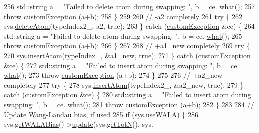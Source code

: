 \begin{DoxyCode}
256             std::string a = \textcolor{stringliteral}{"Failed to delete atom during swapping: "}, b = ce.
      \hyperlink{classcustom_exception_aeb6ab5848b038adfc68fde86a512f691}{what}();
257             \textcolor{keywordflow}{throw} \hyperlink{classcustom_exception}{customException} (a+b);
258         \}
259 
260         \textcolor{comment}{// -a2 completely}
261         \textcolor{keywordflow}{try} \{
262             sys.\hyperlink{classsim_system_acabf4fc5b5b90bba62e1449ddb3646c6}{deleteAtom}(typeIndex2\_, a2, \textcolor{keyword}{true});
263         \} \textcolor{keywordflow}{catch} (\hyperlink{classcustom_exception}{customException} &ce) \{
264             std::string a = \textcolor{stringliteral}{"Failed to delete atom during swapping: "}, b = ce.
      \hyperlink{classcustom_exception_aeb6ab5848b038adfc68fde86a512f691}{what}();
265             \textcolor{keywordflow}{throw} \hyperlink{classcustom_exception}{customException} (a+b);
266         \}
267 
268         \textcolor{comment}{// +a1\_new completely}
269         \textcolor{keywordflow}{try} \{
270             sys.\hyperlink{classsim_system_a0404e9435cc046d19b6bb990678ee069}{insertAtom}(typeIndex\_, &a1\_new, \textcolor{keyword}{true});
271         \} \textcolor{keywordflow}{catch} (\hyperlink{classcustom_exception}{customException} &ce) \{
272             std::string a = \textcolor{stringliteral}{"Failed to insert atom during swapping: "}, b = ce.
      \hyperlink{classcustom_exception_aeb6ab5848b038adfc68fde86a512f691}{what}();
273             \textcolor{keywordflow}{throw} \hyperlink{classcustom_exception}{customException} (a+b);
274         \}
275 
276         \textcolor{comment}{// +a2\_new completely}
277         \textcolor{keywordflow}{try} \{
278             sys.\hyperlink{classsim_system_a0404e9435cc046d19b6bb990678ee069}{insertAtom}(typeIndex2\_, &a2\_new, \textcolor{keyword}{true});
279         \} \textcolor{keywordflow}{catch} (\hyperlink{classcustom_exception}{customException} &ce) \{
280             std::string a = \textcolor{stringliteral}{"Failed to insert atom during swapping: "}, b = ce.
      \hyperlink{classcustom_exception_aeb6ab5848b038adfc68fde86a512f691}{what}();
281             \textcolor{keywordflow}{throw} \hyperlink{classcustom_exception}{customException} (a+b);
282         \}
283 
284         \textcolor{comment}{// Update Wang-Landau bias, if used}
285         \textcolor{keywordflow}{if} (sys.\hyperlink{classsim_system_aa83b00006b3919fb6e13f1bdeadece6a}{useWALA}) \{
286             sys.\hyperlink{classsim_system_a7cb5049de8b0988349e89e30e4000407}{getWALABias}()->\hyperlink{classwala_ab439e3f60bea6c54522a870b9ad67acf}{update}(sys.\hyperlink{classsim_system_a37dd827f4057049763351510147b9f1d}{getTotN}(), sys.

\end{DoxyCode}
